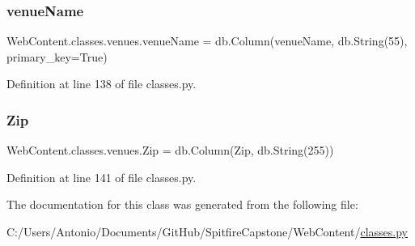 \subsubsection{\texorpdfstring{venue\+Name}{venueName}}
{\footnotesize\ttfamily Web\+Content.\+classes.\+venues.\+venue\+Name = db.\+Column(\textquotesingle{}venue\+Name\textquotesingle{}, db.\+String(55), primary\+\_\+key=True)\hspace{0.3cm}{\ttfamily [static]}}



Definition at line 138 of file classes.\+py.

\mbox{\label{class_web_content_1_1classes_1_1venues_ac3846ed9b5b20948852b9374dd35fd22}} 
\subsubsection{\texorpdfstring{Zip}{Zip}}
{\footnotesize\ttfamily Web\+Content.\+classes.\+venues.\+Zip = db.\+Column(\textquotesingle{}Zip\textquotesingle{}, db.\+String(255))\hspace{0.3cm}{\ttfamily [static]}}



Definition at line 141 of file classes.\+py.



The documentation for this class was generated from the following file\+:\begin{DoxyCompactItemize}
\item 
C\+:/\+Users/\+Antonio/\+Documents/\+Git\+Hub/\+Spitfire\+Capstone/\+Web\+Content/\hyperlink{classes_8py}{classes.\+py}\end{DoxyCompactItemize}
